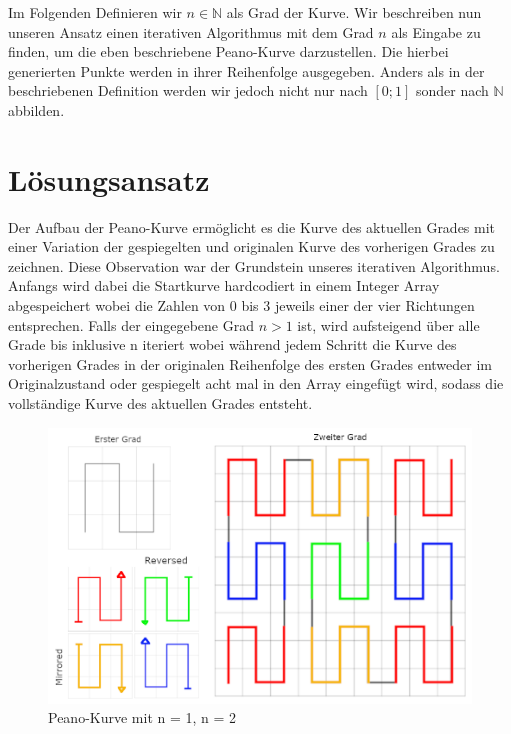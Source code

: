 \documentclass[course=asp]{aspdoc}
\begin{document}
Im Folgenden Definieren wir $n \in \mathbb{N}$ als Grad der Kurve.
Wir beschreiben nun unseren Ansatz einen iterativen Algorithmus mit dem Grad $n$ als Eingabe zu finden, um die eben beschriebene Peano-Kurve darzustellen. Die hierbei generierten Punkte werden in ihrer Reihenfolge ausgegeben. Anders als in der beschriebenen Definition werden wir jedoch nicht nur nach $[0;1]$ sonder nach $\mathbb{N}$ abbilden.


\newpage

\section{Lösungsansatz}
Der Aufbau der Peano-Kurve ermöglicht es die Kurve des aktuellen Grades mit einer Variation der gespiegelten und originalen Kurve des vorherigen Grades zu zeichnen.
Diese Observation war der Grundstein unseres iterativen Algorithmus. Anfangs wird dabei die Startkurve hardcodiert in einem Integer Array abgespeichert wobei die Zahlen von 0 bis 3 jeweils einer der vier Richtungen entsprechen. Falls der eingegebene Grad $n > 1$ ist, wird aufsteigend über alle Grade bis inklusive n iteriert wobei während jedem Schritt die Kurve des vorherigen Grades in der originalen Reihenfolge des ersten Grades entweder im Originalzustand oder gespiegelt acht mal in den Array eingefügt wird, sodass die vollständige Kurve des aktuellen Grades entsteht. 

\begin{figure}[ht]
\centering
\includegraphics{PeanoFarbcodiert.png}
\caption{Peano-Kurve mit n = 1, n = 2}\label{Abb:Peano Lösungsidee}
\end{figure}
\end{document}
